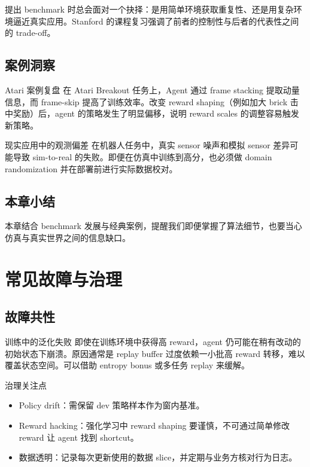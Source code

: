 \documentclass[a4paper]{article}
\begin{document}
提出 benchmark 时总会面对一个抉择：是用简单环境获取重复性、还是用复杂环境逼近真实应用。Stanford 的课程复习强调了前者的控制性与后者的代表性之间的 trade-off。

\subsection{案例洞察}

\begin{importantbox}{Atari 案例复盘}
在 Atari Breakout 任务上，Agent 通过 frame stacking 提取动量信息，而 frame-skip 提高了训练效率。改变 reward shaping（例如加大 brick 击中奖励）后，agent 的策略发生了明显偏移，说明 reward scales 的调整容易触发新策略。
\end{importantbox}

\begin{warningbox}{现实应用中的观测偏差}
在机器人任务中，真实 sensor 噪声和模拟 sensor 差异可能导致 sim-to-real 的失败。即便在仿真中训练到高分，也必须做 domain randomization 并在部署前进行实际数据校对。
\end{warningbox}

\subsection{本章小结}

本章结合 benchmark 发展与经典案例，提醒我们即便掌握了算法细节，也要当心仿真与真实世界之间的信息缺口。

\section{常见故障与治理}

\subsection{故障共性}

\begin{warningbox}{训练中的泛化失败}
即使在训练环境中获得高 reward，agent 仍可能在稍有改动的初始状态下崩溃。原因通常是 replay buffer 过度依赖一小批高 reward 转移，难以覆盖状态空间。可以借助 entropy bonus 或多任务 replay 来缓解。
\end{warningbox}

\begin{knowledgebox}{治理关注点}
\begin{itemize}
    \item Policy drift：需保留 dev 策略样本作为窗内基准。
    \item Reward hacking：强化学习中 reward shaping 要谨慎，不可通过简单修改 reward 让 agent 找到 shortcut。
    \item 数据透明：记录每次更新使用的数据 slice，并定期与业务方核对行为日志。
\end{itemize}
\end{knowledgebox}
\end{document}

